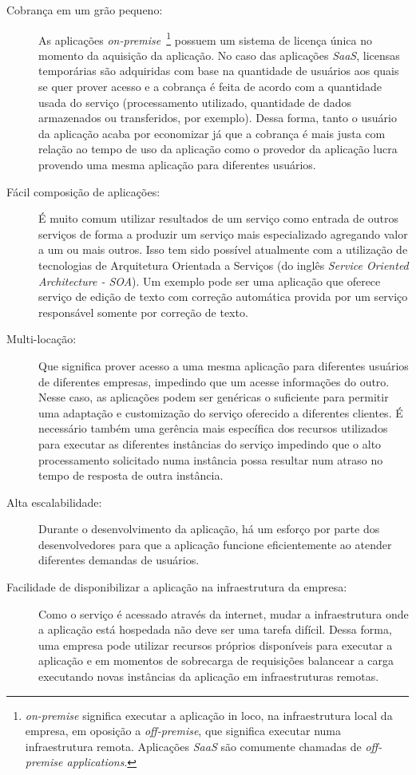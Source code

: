 \documentclass[a4paper,titlepage,12pt]{article}
\begin{document}
\begin{description}
    \item[Cobrança em um grão pequeno:] 
    As aplicações \textit{on-premise}~\footnote{\textit{on-premise} significa executar a aplicação in loco, na infraestrutura local da empresa, em oposição a \textit{off-premise}, que significa executar numa infraestrutura remota. Aplicações \textit{SaaS} são  comumente chamadas de \textit{off-premise applications}.} possuem um sistema de licença única no momento da aquisição da aplicação. No caso das aplicações \textit{SaaS}, licensas temporárias são adquiridas com base na quantidade de usuários aos quais se quer prover acesso e a cobrança é feita de acordo com a quantidade usada do serviço (processamento utilizado, quantidade de dados armazenados ou transferidos, por exemplo). Dessa forma, tanto o usuário da aplicação acaba por economizar já que a cobrança é mais justa com relação ao tempo de uso da aplicação como o provedor da aplicação lucra provendo uma mesma aplicação para diferentes usuários.  
    \item[Fácil composição de aplicações:] É muito comum utilizar resultados de um serviço como entrada de outros serviços de forma a produzir um serviço mais especializado agregando valor a um ou mais outros. Isso tem sido possível atualmente com a utilização de tecnologias de Arquitetura Orientada a Serviços (do inglês \textit{Service Oriented Architecture - SOA}). Um exemplo pode ser uma aplicação que oferece serviço de edição de texto com correção automática provida por um serviço responsável somente por correção de texto.
    \item[Multi-locação:] Que significa prover acesso a uma mesma aplicação para diferentes usuários de diferentes empresas, impedindo que um acesse informações do outro. Nesse caso, as aplicações podem ser genéricas o suficiente para permitir uma adaptação e customização do serviço oferecido a diferentes clientes. É necessário também uma gerência mais específica dos recursos utilizados para executar as diferentes instâncias do serviço impedindo que o alto processamento solicitado numa instância possa resultar num atraso no tempo de resposta de outra instância.
    \item[Alta escalabilidade:] Durante o desenvolvimento da aplicação, há um esforço por parte dos desenvolvedores para que a aplicação funcione eficientemente ao atender diferentes demandas de usuários.
    \item[Facilidade de disponibilizar a aplicação na infraestrutura da empresa:] Como o serviço é acessado através da internet, mudar a infraestrutura onde a aplicação está hospedada não deve ser uma tarefa difícil. Dessa forma, uma empresa pode utilizar recursos próprios disponíveis para executar a aplicação e em momentos de sobrecarga de requisições balancear a carga executando novas instâncias da aplicação em infraestruturas remotas.

\end{description}
\end{document}
